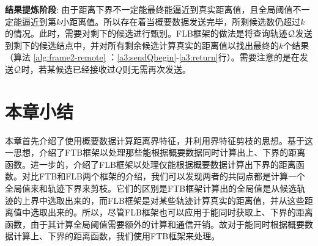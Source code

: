 \textbf{结果提炼阶段}: 由于距离下界不一定能最终能逼近到真实距离值，且全局阈值不一定能逼近到第$k$小距离值。所以存在着当概要数据发送完毕，所剩候选数仍超过$k$的情况。此时，需要对剩下的候选进行甄别。FLB框架的做法是将查询轨迹$\cal Q$发送到剩下的候选结点中，并对所有剩余候选计算真实的距离值以找出最终的$k$个结果（算法 \ref{alg:frame2-remote} ：\ref{a3:sendQbegin}-\ref{a3:return}行）。需要注意的是在发送$\cal Q$时，若某候选已经接收过$Q$则无需再次发送。

\section{本章小结}\label{sec-c3-FrameCMP}
本章首先介绍了使用概要数据计算距离界特征，并利用界特征剪枝的思想。基于这一思想，介绍了FTB框架以处理那些能根据概要数据同时计算出上、下界的距离函数。进一步的，介绍了FLB框架以处理仅能根据概要数据计算出下界的距离函数。对比FTB和FLB两个框架的介绍，我们可以发现两者的共同点都是计算一个全局值来和轨迹下界来剪枝。它们的区别是FTB框架计算出的全局值是从候选轨迹的上界中选取出来的，而FLB框架是对某些轨迹计算真实的距离值，并从这些距离值中选取出来的。所以，尽管FLB框架也可以应用于能同时获取上、下界的距离函数，由于其计算全局阈值需要额外的计算和通信开销。故对于能同时根据概要数据计算上、下界的距离函数，我们使用FTB框架来处理。


\clearpage
\phantom{s}
\clearpage